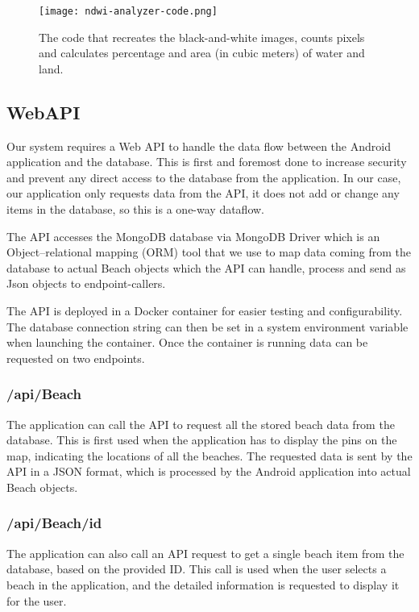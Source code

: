 \begin{figure}[H]
    \centering
    \texttt{[image: ndwi-analyzer-code.png]}
    \caption{The code that recreates the black-and-white images, counts pixels and calculates percentage and area (in cubic meters) of water and land.}
    \label{fig:ndwi-analyzer-code}
\end{figure}

\subsection{WebAPI}

Our system requires a Web API to handle the data flow between the Android application and the database. This is first and foremost done to increase security and prevent any direct access to the database from the application. In our case, our application only requests data from the API, it does not add or change any items in the database, so this is a one-way dataflow.

The API accesses the MongoDB database via MongoDB Driver which is an Object–relational mapping (ORM) tool that we use to map data coming from the database to actual Beach objects which the API can handle, process and send as Json objects to endpoint-callers. 

The API is deployed in a Docker container for easier testing and configurability. The database connection string can then be set in a system environment variable when launching the container. Once the container is running data can be requested on two endpoints.

\subsubsection{/api/Beach}

The application can call the API to request all the stored beach data from the database. This is first used when the application has to display the pins on the map, indicating the locations of all the beaches. The requested data is sent by the API in a JSON format, which is processed by the Android application into actual Beach objects.

\subsubsection{/api/Beach/{id}}

The application can also call an API request to get a single beach item from the database, based on the provided ID. This call is used when the user selects a beach in the application, and the detailed information is requested to display it for the user. 

